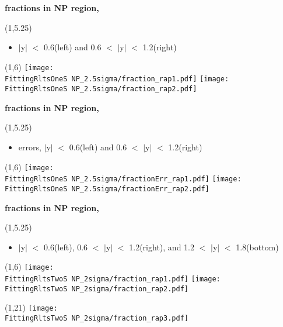 \documentclass[11pt,slidescentered,red,compress,handout,hyperref={bookmarks=true},mathseriftable]{beamer}
\newcommand{\FittingRltsOneS}{../Psi1S/Fit/parameter/evaluateCtau/}
\newcommand{\FittingRltsTwoS}{../Psi2S/Fit/parameter/evaluateCtau/}
\begin{document}
\begin{frame}[t]{\small \bf fractions in NP region,  }{}
\begin{textblock}{48}(1,5.25)
\begin{itemize}
\scriptsize \item  $|$y$|$ $<$ 0.6(left) and 0.6 $<$ $|$y$|$ $<$ 1.2(right)
\end{itemize}
\end{textblock}
\begin{textblock}{48}(1,6)
\hspace*{10pt} \texttt{[image: \\FittingRltsOneS NP\_2.5sigma/fraction\_rap1.pdf]}
\hspace*{10pt} \texttt{[image: \\FittingRltsOneS NP\_2.5sigma/fraction\_rap2.pdf]}
\end{textblock}
\end{frame}

\begin{frame}[t]{\small \bf fractions in NP region,  }{}
\begin{textblock}{48}(1,5.25)
\begin{itemize}
\scriptsize \item  errors, $|$y$|$ $<$ 0.6(left) and 0.6 $<$ $|$y$|$ $<$ 1.2(right)
\end{itemize}
\end{textblock}
\begin{textblock}{48}(1,6)
\hspace*{10pt} \texttt{[image: \\FittingRltsOneS NP\_2.5sigma/fractionErr\_rap1.pdf]}
\hspace*{10pt} \texttt{[image: \\FittingRltsOneS NP\_2.5sigma/fractionErr\_rap2.pdf]}
\end{textblock}
\end{frame}

\begin{frame}[t]{\small \bf fractions in NP region,  }{}
\begin{textblock}{48}(1,5.25)
\begin{itemize}
\scriptsize \item  $|$y$|$ $<$ 0.6(left), 0.6 $<$ $|$y$|$ $<$ 1.2(right), and 1.2 $<$ $|$y$|$ $<$ 1.8(bottom)
\end{itemize}
\end{textblock}
\begin{textblock}{48}(1,6)
\hspace*{10pt} \texttt{[image: \\FittingRltsTwoS NP\_2sigma/fraction\_rap1.pdf]}
\hspace*{10pt} \texttt{[image: \\FittingRltsTwoS NP\_2sigma/fraction\_rap2.pdf]}
\begin{textblock}{48}(1,21)
\hspace*{10pt} \texttt{[image: \\FittingRltsTwoS NP\_2sigma/fraction\_rap3.pdf]}
\end{textblock}
\end{textblock}
\end{frame}
\end{document}
